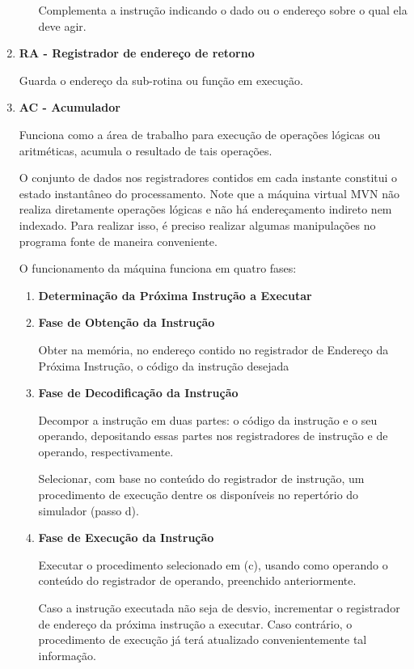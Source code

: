 \begin{enumerate}
\begin{enumerate}
		Complementa a instrução indicando o dado ou o endereço sobre o qual ela deve agir.
	\end{enumerate}

	\item \textbf{RA - Registrador de endereço de retorno}
	

	Guarda o endereço da sub-rotina ou função em execução.

	\item \textbf{AC - Acumulador}
	

	Funciona como a área de trabalho para execução de operações lógicas ou aritméticas, acumula o resultado de tais operações.

			 	 	 		
	O conjunto de dados nos registradores contidos em cada instante constitui o estado instantâneo  do processamento. Note que a máquina virtual MVN não realiza diretamente operações lógicas e não há endereçamento indireto nem indexado. Para realizar isso, é preciso realizar algumas manipulações no programa fonte de maneira conveniente.

	
	O funcionamento da máquina funciona em quatro fases:
	\begin{enumerate}
		\item \textbf{Determinação da Próxima Instrução a Executar}

		\item \textbf{Fase de Obtenção da Instrução}


		Obter na memória, no endereço contido no registrador de Endereço da Próxima Instrução, o código da instrução desejada

		\item \textbf{Fase de Decodificação da Instrução}


		Decompor a instrução em duas partes: o código da instrução e o seu operando, depositando essas partes nos registradores de instrução e de operando, respectivamente.


		Selecionar, com base no conteúdo do registrador de instrução, um procedimento de execução dentre os disponíveis no repertório do simulador (passo d). 

		\item \textbf{Fase de Execução da Instrução}


		Executar o procedimento selecionado em (c), usando como operando o conteúdo do registrador de operando, preenchido anteriormente.

		Caso a instrução executada não seja de desvio, incrementar o registrador de endereço da próxima instrução a executar. Caso contrário, o procedimento de execução já terá atualizado convenientemente tal informação.


\end{enumerate}
\end{enumerate}
